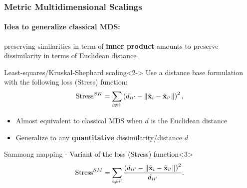 \documentclass{beamer}\usepackage[]{graphicx}\usepackage[]{color}
\begin{document}
\begin{frame}
  \frametitle{Metric Multidimensional Scalings}
  
  \paragraph{Idea to generalize classical MDS:} preserving similarities in term of \alert{\bf inner product} amounts to preserve dissimilarity in terms of Euclidean distance

  \begin{block}{Least-squares/Kruskal-Shephard scaling}<2->
      Use a distance base formulation with the following loss (Stress) function:
      \begin{equation*}
        \text{Stress}^{SK} = \sum_{i\neq i'} \left(d_{ii'} - \|\tilde{\mathbf{x}}_i - \tilde{\mathbf{x}}_{i'}\| \right)^2,
      \end{equation*}
      \begin{itemize}
        \item[\rsa] Almost equivalent to classical MDS when $d$ is the Euclidean distance
        \item[\rsa] Generalize to any \alert{\bf quantitative} dissimilarity/distance $d$
      \end{itemize}
  \end{block}

  \begin{block}{Sammong mapping - \textcolor{black}{Variant of the loss (Stress) function}}<3>
    \vspace{-.5cm}
      \begin{equation*}
        \text{Stress}^{SM} = \sum_{i\neq i'} \frac{\left(d_{ii'} - \|\tilde{\mathbf{x}}_i - \tilde{\mathbf{x}}_{i'}\| \right)^2}{d_{ii'}}.
      \end{equation*}
  \end{block}

\end{frame}
\end{document}
